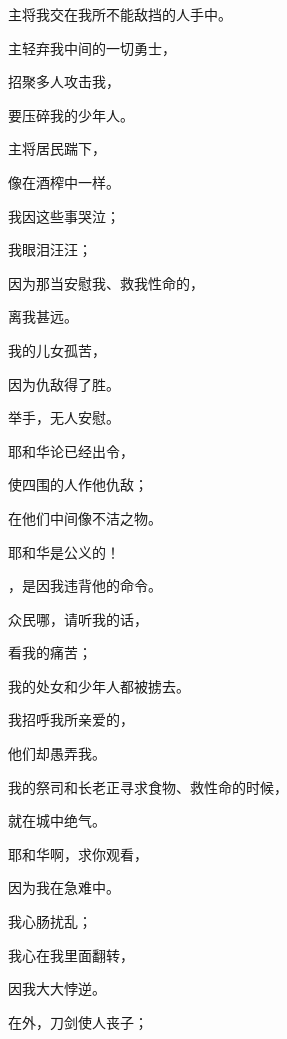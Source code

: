 {\par }{\Q 主将我交在我所不能敌挡的人手中。
\par }{\BB \par }{\Q {}主轻弃我中间的一切勇士，
\par }{\Q 招聚多人攻击我，
\par }{\Q 要压碎我的少年人。
\par }{\Q 主将{}居民踹下，
\par }{\Q 像在酒榨中一样。
\par }{\BB \par }{\Q {}我因这些事哭泣；
\par }{\Q 我眼泪汪汪；
\par }{\Q 因为那当安慰我、救我性命的，
\par }{\Q 离我甚远。
\par }{\Q 我的儿女孤苦，
\par }{\Q 因为仇敌得了胜。
\par }{\BB \par }{\Q {}举手，无人安慰。
\par }{\Q 耶和华论{}已经出令，
\par }{\Q 使四围的人作他仇敌；
\par }{在他们中间像不洁之物。
\par }{\BB \par }{\Q {}耶和华是公义的！
\par }{，是因我违背他的命令。
\par }{\Q 众民哪，请听我的话，
\par }{\Q 看我的痛苦；
\par }{\Q 我的处女和少年人都被掳去。
\par }{\BB \par }{\Q {}我招呼我所亲爱的，
\par }{\Q 他们却愚弄我。
\par }{\Q 我的祭司和长老正寻求食物、救性命的时候，
\par }{\Q 就在城中绝气。
\par }{\BB \par }{\Q {}耶和华啊，求你观看，
\par }{\Q 因为我在急难中。
\par }{\Q 我心肠扰乱；
\par }{\Q 我心在我里面翻转，
\par }{\Q 因我大大悖逆。
\par }{\Q 在外，刀剑使人丧子；
}
